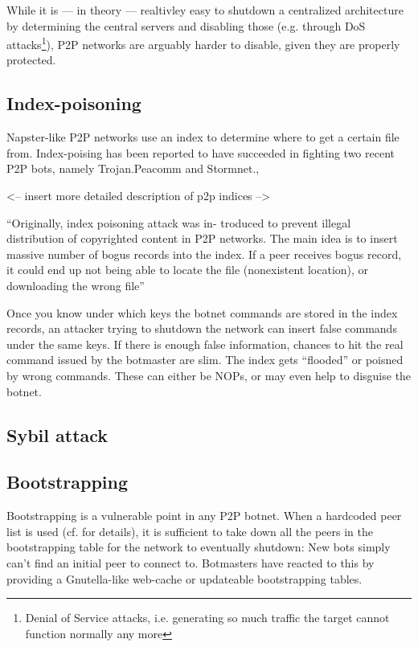 \documentclass{llncs}
\begin{document}
While it is --- in theory --- realtivley easy to shutdown a centralized architecture by determining the central servers and disabling those (e.g. through DoS attacks\footnote{Denial of Service attacks, i.e. generating so much traffic the target cannot function normally any more}), P2P networks are arguably harder to disable, given they are properly protected. 

\subsection{Index-poisoning}
Napster-like P2P networks use an index to determine where to get a
certain file from. Index-poising has been reported to have succeeded
in fighting two recent P2P bots, namely Trojan.Peacomm and
Stormnet.\cite{grizzard2007peer}, \cite{liang2006index} 

<-- insert more detailed description of p2p indices -->

``Originally, index poisoning attack was in- troduced to prevent
illegal distribution of copyrighted content in P2P networks. The main
idea is to insert massive number of bogus records into the index. If a
peer receives bogus record, it could end up not being able to locate
the file (nonexistent location), or downloading the wrong
file''\cite{wang2009systematic}

Once you know under which keys the botnet commands are stored in the
index records, an attacker trying to shutdown the network can insert
false commands under the same keys. If there is enough false
information, chances to hit the real command issued by the botmaster
are slim. The index gets ``flooded'' or poisned by wrong
commands. These can either be NOPs, or may even help to disguise the
botnet.


\subsection{Sybil attack}

\subsection{Bootstrapping}
Bootstrapping is a vulnerable point in any P2P botnet. When a hardcoded peer list is used (cf. for details), it is sufficient to take down all the peers in the bootstrapping table for the network to eventually shutdown: New bots simply can't find an initial peer to connect to. Botmasters have reacted to this by providing a Gnutella-like web-cache or updateable bootstrapping tables.



\end{document}
